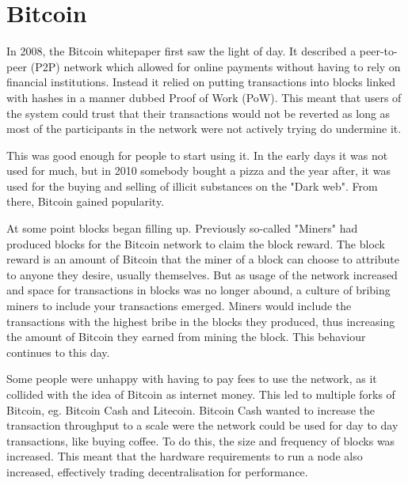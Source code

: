 \section{Bitcoin}


In 2008, the Bitcoin whitepaper first saw the light of day\cite{btcwhite}. It described a peer-to-peer (P2P) network which allowed for online payments without having to rely on financial institutions. Instead it relied on putting transactions into blocks linked with hashes in a manner dubbed Proof of Work (PoW). This meant that users of the system could trust that their transactions would not be reverted as long as most of the participants in the network were not actively trying do undermine it. 

This was good enough for people to start using it. In the early days it was not used for much, but in 2010 somebody bought a pizza and the year after, it was used for the buying and selling of illicit substances on the "Dark web"\cite{pizza}\cite{silkroad}. From there, Bitcoin gained popularity.

At some point blocks began filling up. Previously so-called "Miners" had produced blocks for the Bitcoin network to claim the block reward.  The block reward is an amount of Bitcoin that the miner of a block can choose to attribute to anyone they desire, usually themselves. But as usage of the network increased and space for transactions in blocks was no longer abound, a culture of bribing miners to include your transactions emerged. Miners would include the transactions with the highest bribe in the blocks they produced, thus increasing the amount of Bitcoin they earned from mining the block. This behaviour continues to this day.

Some people were unhappy with having to pay fees to use the network, as it collided with the idea of Bitcoin as internet money. This led to multiple forks of Bitcoin, eg. Bitcoin Cash and Litecoin. Bitcoin Cash wanted to increase the transaction throughput to a scale were the network could be used for day to day transactions, like buying coffee. To do this, the size and frequency of blocks was increased. This meant that the hardware requirements to run a node also increased, effectively trading decentralisation for performance.




